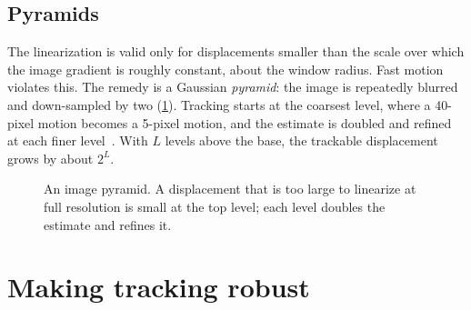 \subsection{Pyramids}

The linearization is valid only for displacements smaller than the scale over which the image gradient is roughly
constant, about the window radius. Fast motion violates this. The remedy is a Gaussian \emph{pyramid}: the image is
repeatedly blurred and down-sampled by two (\cref{fig:pyramid}). Tracking starts at the coarsest level, where a
40-pixel motion becomes a 5-pixel motion, and the estimate is doubled and refined at each finer
level~\cite{bouguet2001pyramidal}. With $L$ levels above the base, the trackable displacement grows by about $2^L$.

\begin{figure}[t]
\centering
{}
\caption{An image pyramid. A displacement that is too large to linearize at full resolution is small at the top
level; each level doubles the estimate and refines it.}
\label{fig:pyramid}
\end{figure}

\section{Making tracking robust}

